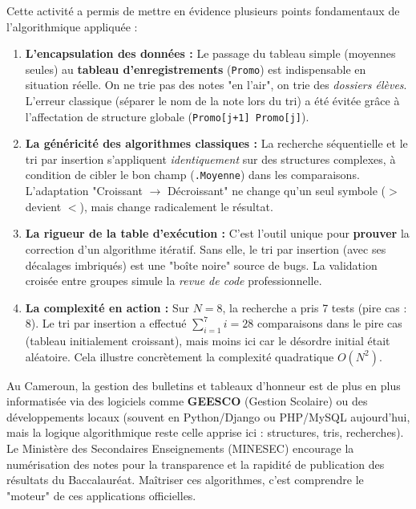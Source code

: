\documentclass[11pt]{article}
\newcounter{popsec}
\newcounter{popsub}
\newcommand{\courssub}[1]{%
  \stepcounter{popsub}%
  \par\vspace{9pt}\noindent{\popxbold\fontsize{11.5}{13}\selectfont\color{popink}{\color{poporange}\thepopsec.\thepopsub}\hspace{6pt}#1}\par\nopagebreak\vspace{4pt}
}
\begin{document}
\courssub{Bilan de l'activité}
Cette activité a permis de mettre en évidence plusieurs points fondamentaux de l'algorithmique appliquée :
\begin{enumerate}
    \item \textbf{L'encapsulation des données :} Le passage du tableau simple (moyennes seules) au \textbf{tableau d'enregistrements} (\texttt{Promo}) est indispensable en situation réelle. On ne trie pas des notes "en l'air", on trie des \emph{dossiers élèves}. L'erreur classique (séparer le nom de la note lors du tri) a été évitée grâce à l'affectation de structure globale (\texttt{Promo[j+1] \textleftarrow Promo[j]}).
    \item \textbf{La généricité des algorithmes classiques :} La recherche séquentielle et le tri par insertion s'appliquent \emph{identiquement} sur des structures complexes, à condition de cibler le bon champ (\texttt{.Moyenne}) dans les comparaisons. L'adaptation "Croissant $\to$ Décroissant" ne change qu'un seul symbole ($>$ devient $<$), mais change radicalement le résultat.
    \item \textbf{La rigueur de la table d'exécution :} C'est l'outil unique pour \textbf{prouver} la correction d'un algorithme itératif. Sans elle, le tri par insertion (avec ses décalages imbriqués) est une "boîte noire" source de bugs. La validation croisée entre groupes simule la \emph{revue de code} professionnelle.
    \item \textbf{La complexité en action :} Sur $N=8$, la recherche a pris 7 tests (pire cas : 8). Le tri par insertion a effectué $\sum_{i=1}^{7} i = 28$ comparaisons dans le pire cas (tableau initialement croissant), mais moins ici car le désordre initial était aléatoire. Cela illustre concrètement la complexité quadratique $O(N^2)$.
\end{enumerate}

\begin{savaistu}
Au Cameroun, la gestion des bulletins et tableaux d'honneur est de plus en plus informatisée via des logiciels comme \textbf{GEESCO} (Gestion Scolaire) ou des développements locaux (souvent en Python/Django ou PHP/MySQL aujourd'hui, mais la logique algorithmique reste celle apprise ici : structures, tris, recherches). Le Ministère des Secondaires Enseignements (MINESEC) encourage la numérisation des notes pour la transparence et la rapidité de publication des résultats du Baccalauréat. Maîtriser ces algorithmes, c'est comprendre le "moteur" de ces applications officielles.
\end{savaistu}
\end{document}
